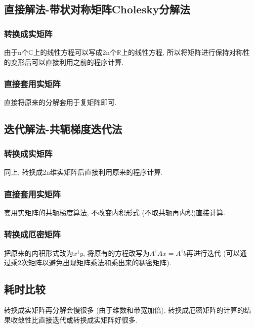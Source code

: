 \documentclass[UTF8]{ctexart}
\begin{document}
        \subsection{直接解法-带状对称矩阵Cholesky分解法}
            \subsubsection{转换成实矩阵}
                \indent 由于n个$\mathbb{C}$上的线性方程可以写成2n个$\mathbb{R}$上的线性方程,
                所以将矩阵进行保持对称性的变形后可以直接利用之前的程序计算.
            \subsubsection{直接套用实矩阵}
                \indent 直接将原来的分解套用于复矩阵即可.
        \subsection{迭代解法-共轭梯度迭代法}
            \subsubsection{转换成实矩阵}
                \indent 同上, 转换成2n维实矩阵后直接利用原来的程序计算.
            \subsubsection{直接套用实矩阵}
                \indent 套用实矩阵的共轭梯度算法, 不改变内积形式 (不取共轭再内积)直接计算.
            \subsubsection{转换成厄密矩阵}
                \indent 把原来的内积形式改为$x^\dagger y$, 将原有的方程改写为$A^\dagger Ax=A^\dagger b$再进行迭代
                (可以通过乘2次矩阵以避免出现矩阵乘法和乘出来的稠密矩阵).
        \subsection{耗时比较}
            \indent 转换成实矩阵再分解会慢很多 (由于维数和带宽加倍), 转换成厄密矩阵的计算的结果收敛性比直接迭代或转换成实矩阵好很多.
\end{document}
